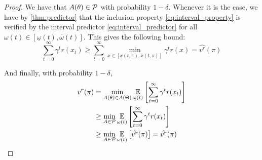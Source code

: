 \documentclass{article}
\begin{document}
\begin{proof}
We have that $A(\theta) \in \mathcal{P}$ with probability $1-\delta$. Whenever it is the case, we have by \autoref{thm:predictor} that the inclusion property \eqref{eq:interval_property} is verified by the interval predictor \eqref{eq:interval_predictor} for all $\omega(t)\in[\underline{\omega}(t), \overline{\omega}(t)]$. This gives the following bound:
\begin{equation*}
 \sum_{t=0}^\infty \gamma^t r(x_t) \geq \sum_{t=0}^\infty \min_{x\in[\underline{x}(t, \pi), \overline{x}(t, \pi)]} \gamma^t r(x) = \hat{v^r}(\pi)
\end{equation*}

And finally, with probability $1-\delta$,
\begin{align*}
v^r(\pi) &= \min_{A(\theta) \in A(\Theta)} \operatorname*{\mathbb{E}}\limits_{\omega(t)}\left[\sum_{t=0}^\infty \gamma^t r(x_t)\right] \\
&\geq \min_{A \in \mathcal{P}} \operatorname*{\mathbb{E}}\limits_{\omega(t)}\left[\sum_{t=0}^\infty \gamma^t r(x_t)\right] \\
& \geq \min_{A \in \mathcal{P}} \operatorname*{\mathbb{E}}\limits_{\omega(t)}\left[\hat{v^r}(\pi)\right] = \hat{v^r}(\pi)
\end{align*}
\end{proof}
\end{document}
